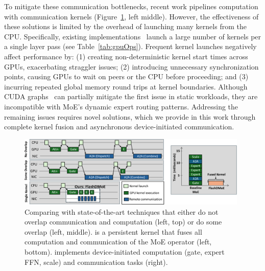 
To mitigate these communication bottlenecks, recent work pipelines computation with communication kernels (Figure~\ref{fig:intro}, left middle). However, the effectiveness of these solutions is limited by the overhead of launching many kernels from the CPU. 
Specifically, existing implementations~\cite{pmlr-v162-rajbhandari22a, comet, megatron, fastermoe} launch a large number of kernels per a single layer pass (see Table~\ref{tab:gpuOps}). Frequent kernel launches negatively affect performance by:
(1) creating non-deterministic kernel start times across GPUs, exacerbating straggler issues; (2) introducing unnecessary synchronization points, causing GPUs to wait on peers or the CPU before proceeding; and (3) incurring repeated global memory round trips at kernel boundaries. Although CUDA graphs~\cite{cuda_graphs_nvidia_blog} can partially mitigate the first issue in static workloads, they are incompatible with MoE's dynamic expert routing patterns. Addressing the remaining issues requires novel solutions,
which we provide in this work through complete kernel fusion and asynchronous device-initiated communication.


\begin{figure}[!ht]
    \centering
    \includegraphics[width=0.98\textwidth, keepaspectratio]{figures/intro-fig}
    \caption{Comparing \sysname with state-of-the-art techniques that either do not overlap communication and computation (left, top) or do some overlap (left, middle). \sysname is a persistent kernel that fuses all computation and communication of the MoE operator (left, bottom). \sysname implements device-initiated computation (gate, expert FFN, scale) and communication tasks (right).}
    \label{fig:intro}
    \vspace{-10pt}
\end{figure}


